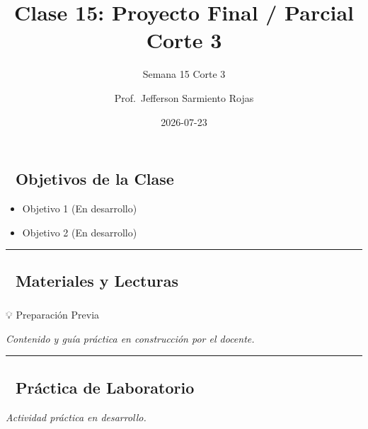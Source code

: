 \documentclass[
  letterpaper,
  DIV=11,
  numbers=noendperiod]{scrartcl}
\title{Clase 15: Proyecto Final / Parcial Corte 3}
\subtitle{Semana 15 \textbar{} Corte 3}
\author{Prof.~Jefferson Sarmiento Rojas}
\date{2026-07-23}
\makeatletter
\let\oldsubparagraph\subparagraph
\renewcommand{\subparagraph}{
    \@ifstar
      \xxxSubParagraphStar
      \xxxSubParagraphNoStar
  }
\newcommand{\xxxSubParagraphStar}[1]{\oldsubparagraph*{#1}\mbox{}}
\newcommand{\xxxSubParagraphNoStar}[1]{\oldsubparagraph{#1}\mbox{}}
\providecommand{\tightlist}{%
  \setlength{\itemsep}{0pt}\setlength{\parskip}{0pt}}
\renewcommand*\contentsname{Table of contents}
\newcommand\contentsname{Table of contents}
\makeatother
\begin{document}
\maketitle

\renewcommand*\contentsname{Table of contents}
{
\hypersetup{linkcolor=}
\setcounter{tocdepth}{3}
\tableofcontents
}

\subsection{🎯 Objetivos de la Clase}\label{objetivos-de-la-clase}

\begin{itemize}
\tightlist
\item[$\square$]
  Objetivo 1 (En desarrollo)
\item[$\square$]
  Objetivo 2 (En desarrollo)
\end{itemize}

\begin{center}\rule{0.5\linewidth}{0.5pt}\end{center}

\subsection{📖 Materiales y Lecturas}\label{materiales-y-lecturas}

\subparagraph{💡 Preparación Previa}\label{preparaciuxf3n-previa}

\emph{Contenido y guía práctica en construcción por el docente.}

\begin{center}\rule{0.5\linewidth}{0.5pt}\end{center}

\subsection{🧪 Práctica de
Laboratorio}\label{pruxe1ctica-de-laboratorio}

\emph{Actividad práctica en desarrollo.}
\end{document}
